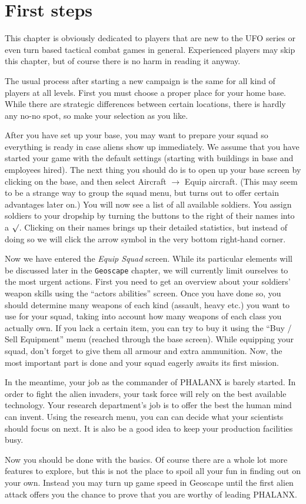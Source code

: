 \section{First steps}
This chapter is obviously dedicated to players that are new to the UFO series or even turn based tactical combat games in general. Experienced players may skip this chapter, but of course there is no harm in reading it anyway.

The usual process after starting a new campaign is the same for all kind of players at all levels. First you must choose a proper place for your home base. While there are strategic differences between certain locations, there is hardly any no-no spot, so make your selection as you like.

After you have set up your base, you may want to prepare your squad so everything is ready in case aliens show up immediately. We assume that you have started your game with the default settings (starting with buildings in base and employees hired). The next thing you should do is to open up your base screen by clicking on the base, and then select Aircraft $\rightarrow$ Equip aircraft. (This may seem to be a strange way to group the squad menu, but turns out to offer certain advantages later on.) You will now see a list of all available soldiers. You assign soldiers to your dropship by turning the  buttons to the right of their names into a $\surd$. Clicking on their names brings up their detailed statistics, but instead of doing so we will click the arrow symbol in the very bottom right-hand corner.

Now we have entered the \emph{Equip Squad} screen. While its particular elements will be discussed later in the \texttt{Geoscape} chapter, we will currently limit ourselves to the most urgent actions. First you need to get an overview about your soldiers' weapon skills using the ``actors abilities'' screen. Once you have done so, you should determine many weapons of each kind (assault, heavy etc.) you want to use for your squad, taking into account how many weapons of each class you actually own. If you lack a certain item, you can try to buy it using the ``Buy / Sell Equipment'' menu (reached through the base screen). While equipping your squad, don't forget to give them all armour and extra ammunition. Now, the most important part is done and your squad eagerly awaits its first mission.

In the meantime, your job as the commander of PHALANX is barely started. In order to fight the alien invaders, your task force will rely on the best available technology. Your research department's job is to offer the best the human mind can invent. Using the research menu, you can can decide what your scientists should focus on next. It is also be a good idea to keep your production facilities busy.

Now you should be done with the basics. Of course there are a whole lot more features to explore, but this is not the place to spoil all your fun in finding out on your own. Instead you may turn up game speed in Geoscape until the first alien attack offers you the chance to prove that you are worthy of leading PHALANX.